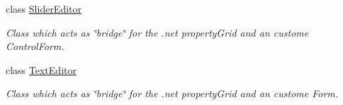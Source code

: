 \begin{DoxyCompactItemize}
class \hyperlink{class_a_rdev_kit_1_1_view_1_1_slider_editor}{Slider\-Editor}
\begin{DoxyCompactList}\small\item\em Class which acts as \char`\"{}bridge\char`\"{} for the .net property\-Grid and an custome Control\-Form. \end{DoxyCompactList}\item 
class \hyperlink{class_a_rdev_kit_1_1_view_1_1_text_editor}{Text\-Editor}
\begin{DoxyCompactList}\small\item\em Class which acts as \char`\"{}bridge\char`\"{} for the .net property\-Grid and an custome Form. \end{DoxyCompactList}\end{DoxyCompactItemize}
